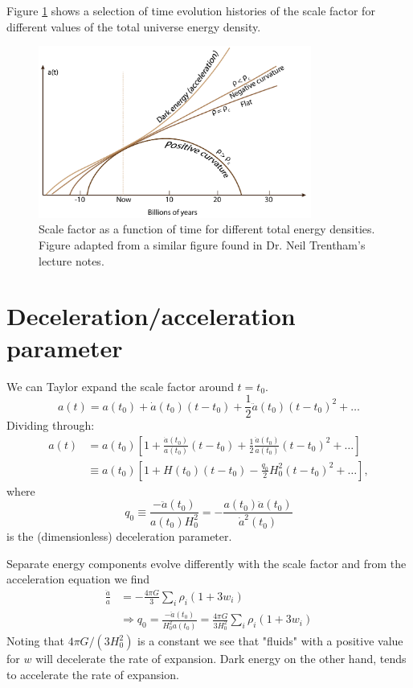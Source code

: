 \documentclass[a4paper,12pt]{article}
\theoremstyle{remark}
\renewcommand{\=}[1]{\stackrel{#1}{=}} %
\theoremstyle{plain}
\theoremstyle{definition}
\begin{document}
Figure \ref{fig:history} shows a selection of time evolution histories of the scale factor for different values of the total universe energy density.
 
\begin{figure}[t]
\begin{center}
    \includegraphics*[angle=0,width=0.8\textwidth]{img/history_of_universe.png}
    \caption[Scale factor development]{Scale factor as a function of time for different total energy densities. Figure adapted from a similar figure found in Dr. Neil Trentham's lecture notes.}
\label{fig:history}
\end{center}
\end{figure}

\section{Deceleration/acceleration parameter}
We can Taylor expand the scale factor around $t = t_0$.
\begin{equation}
a(t) = a(t_0) + \dot{a}(t_0)(t-t_0) + \frac{1}{2}\ddot{a}(t_0)(t-t_0)^2 + \ldots
\end{equation}
Dividing through:
\begin{align}
a(t) &= a(t_0) \left[ 1 + \frac{\dot{a}(t_0)}{a(t_0)}(t-t_0) + \frac{1}{2}\frac{\ddot{a}(t_0)}{a(t_0)}(t-t_0)^2 + \ldots \right] \nonumber \\
&\equiv a(t_0) \left[ 1 + H(t_0)(t-t_0) - \frac{q_0}{2} H_0^2(t-t_0)^2 + \ldots \right],
\end{align}
where 
\begin{equation}
q_0 \equiv \frac{-\ddot{a}(t_0)}{a(t_0) H^2_0} = -\frac{a(t_0)\ddot{a}(t_0)}{\dot{a}^2 (t_0)}
\end{equation}
is the (dimensionless) deceleration parameter. 

Separate energy components evolve differently with the scale factor and from the acceleration equation we find 
\begin{align}
\frac{\ddot{a}}{a} &= - \frac{4\pi G}{3} \sum _i \rho _i (1 + 3w_i) \\
&\Rightarrow q_0 = \frac{-\ddot{a}(t_0)}{H_0^{2}a(t_0)} = \frac{4\pi G}{3H_0^{2}} \sum_i \rho _i (1 + 3w_i)
\end{align}
Noting that $4\pi G / (3 H_0^{2})$ is a constant we see that "fluids" with a positive value for $w$ will decelerate the rate of expansion. Dark energy on the other hand, tends to accelerate the rate of expansion.
\end{document}
